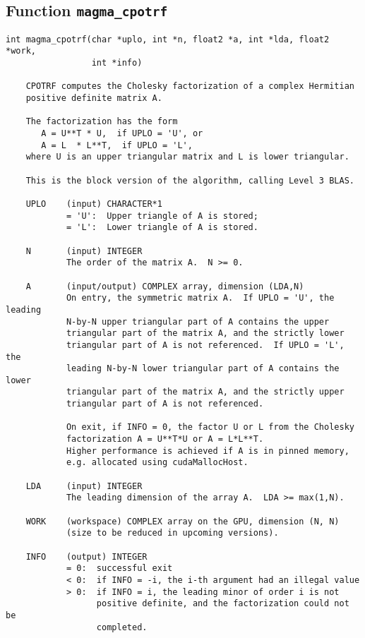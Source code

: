 \documentclass[10pt]{book}
\begin{document}
\subsection{Function {\tt {\bf magma\_cpotrf}}}
\begin{verbatim}
int magma_cpotrf(char *uplo, int *n, float2 *a, int *lda, float2 *work, 
                 int *info)
   
    CPOTRF computes the Cholesky factorization of a complex Hermitian   
    positive definite matrix A.   

    The factorization has the form   
       A = U**T * U,  if UPLO = 'U', or   
       A = L  * L**T,  if UPLO = 'L',   
    where U is an upper triangular matrix and L is lower triangular.   

    This is the block version of the algorithm, calling Level 3 BLAS.   

    UPLO    (input) CHARACTER*1   
            = 'U':  Upper triangle of A is stored;   
            = 'L':  Lower triangle of A is stored.   

    N       (input) INTEGER   
            The order of the matrix A.  N >= 0.   

    A       (input/output) COMPLEX array, dimension (LDA,N)   
            On entry, the symmetric matrix A.  If UPLO = 'U', the leading   
            N-by-N upper triangular part of A contains the upper   
            triangular part of the matrix A, and the strictly lower   
            triangular part of A is not referenced.  If UPLO = 'L', the   
            leading N-by-N lower triangular part of A contains the lower   
            triangular part of the matrix A, and the strictly upper   
            triangular part of A is not referenced.   

            On exit, if INFO = 0, the factor U or L from the Cholesky   
            factorization A = U**T*U or A = L*L**T.   
            Higher performance is achieved if A is in pinned memory, 
            e.g. allocated using cudaMallocHost.

    LDA     (input) INTEGER   
            The leading dimension of the array A.  LDA >= max(1,N).   

    WORK    (workspace) COMPLEX array on the GPU, dimension (N, N)
            (size to be reduced in upcoming versions).

    INFO    (output) INTEGER   
            = 0:  successful exit   
            < 0:  if INFO = -i, the i-th argument had an illegal value   
            > 0:  if INFO = i, the leading minor of order i is not   
                  positive definite, and the factorization could not be   
                  completed.   
\end{verbatim}
\end{document}
